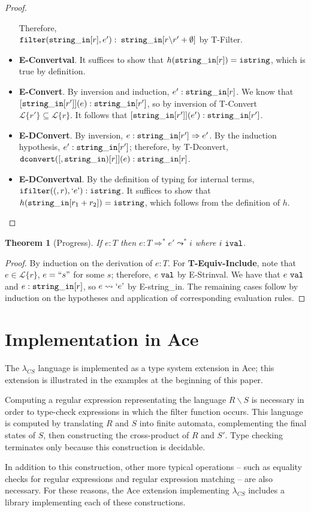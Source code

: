 \documentclass[10pt,preprint]{sigplanconf}
\newtheorem{thm}{Theorem}
\theoremstyle{definition}
\newcommand{\Lagr}{\mathcal{L}}
\newcommand{\strin}{{\tt string\_in}}
\newcommand{\lang}[1]{\Lagr\{#1\}}
\newcommand{\istr}{ {\tt istring} }
\newcommand{\dconvert}[2]{ {\tt dconvert}(#1,#2) }
\newcommand{\ifilter}[2]{ {\tt ifilter}(#1,#2) }
\newcommand{\reduces}{ \Rightarrow }
\newcommand{\ireduces}{ \leadsto }
\newcommand{\val}{ \ {\tt val} }
\newcommand{\ival}{ \ {\tt ival} }
\newcommand{\istrf}[1]{`#1\textrm'} %
\newcommand{\strf}[1]{``#1"}
\newcommand{\lcs}{\lambda_{CS}}
\begin{document}
\begin{proof}
\begin{itemize}[label=$ $,itemsep=1ex]
    Therefore, \\${\tt filter}(\strin[r], e'):$ $\strin[r \backslash r' + \emptyset]$ by T-Filter.
  \item \textbf{E-Convertval}. It suffices to show that $h(\strin[r]) = \istr$, which is true by definition.
  \item \textbf{E-Convert}. By inversion and induction, $e' : \strin[r]$. We know that $[\strin[r']](e) : \strin[r']$, so by inversion of T-Convert $\lang{r'} \subseteq \lang{r}$.
    It follows that $[\strin[r']](e') : \strin[r']$.
  \item \textbf{E-DConvert}. By inversion, $e : \strin[r'] \reduces e'$. By the induction hypothesis, $e' : \strin[r']$; therefore, by T-Dconvert, $\dconvert[\strin[r]](e):\strin[r]$.
  \item \textbf{E-DConvertval}. By the definition of typing for internal terms, $\ifilter(r,\istrf{e}) : \istr$. It suffices to show that $h(\strin[r_1+r_2]) = \istr$, which follows from the definition of $h$.
\end{itemize}
\end{proof}

\begin{thm}[Progress]
  If $e:T$ then $e:T \reduces^* e' \ireduces^* i$ where $i \ival$.
\end{thm}
\begin{proof}
By induction on the derivation of $e:T$.
For \textbf{T-Equiv-Include}, note that $e \in \lang{r}$, $e = \strf{s}$ for some $s$; therefore, $e \val$ by E-Strinval. 
We have that $e \val$ and $e : \strin[r]$, so $e \ireduces \istrf{e}$ by E-string\_in.
The remaining cases follow by induction on the hypotheses and application of corresponding evaluation rules.
\end{proof}

\section{Implementation in Ace}

The $\lcs$ language is implemented as a type system extension in Ace; this extension
is illustrated in the examples at the beginning of this paper.

Computing a regular expression representating the language
$R \backslash S$ is necessary in order to type-check expressions in which the filter function
occurs. This language is computed by translating $R$ and $S$ into finite automata,
complementing the final states of $S$, then constructing the cross-product of $R$
and $S'$. Type checking terminates only because this construction is decidable.

In addition to this construction, other more typical operations -- such
as equality checks for regular expressions and regular expression matching -- are
also necessary. For these reasons, the Ace extension implementing $\lcs$ includes a library
implementing each of these constructions.
\end{document}

